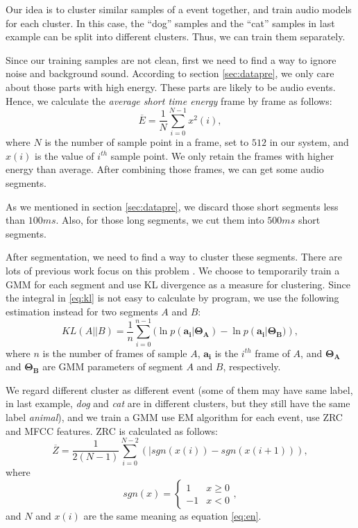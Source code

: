 Our idea is to cluster similar samples of a event together, and train audio models for each cluster. In this case, the ``dog'' samples and the ``cat'' samples in last example can be split into different clusters. Thus, we can train them separately.

Since our training samples are not clean, first we need to find a way to ignore noise and background sound. According to section \ref{sec:datapre}, we only care about those parts with high energy. These parts are likely to be audio events. Hence, we calculate the {\em average short time energy} frame by frame as follows:
\begin{equation}
\overline{E} = \frac{1}{N}\sum_{i=0}^{N-1}x^2(i),
\label{eq:en}
\end{equation}
where $N$ is the number of sample point in a frame, set to $512$ in our system, and $x(i)$ is the value of $i^{th}$ sample point. We only retain the frames with higher energy than average. After combining those frames, we can get some audio segments.

As we mentioned in section \ref{sec:datapre}, we discard those short segments less than $100ms$. Also, for those long segments, we cut them into $500ms$ short segments.

After segmentation, we need to find a way to cluster these segments. There are lots of previous work focus on this problem \cite{4587600}. We choose to temporarily train a GMM for each segment and use KL divergence as a measure for clustering. Since the integral in \ref{eq:kl} is not easy to calculate by program, we use the following estimation instead for two segments $A$ and $B$:
\begin{equation}
KL(A||B) = \frac{1}{n}\sum_{i=0}^{n-1}(\ln p(\mathbf{a_i}|\mathbf{\Theta_A}) - \ln p(\mathbf{a_i}|\mathbf{\Theta_B)}),
\end{equation}
where $n$ is the number of frames of sample $A$, $\mathbf{a_i}$ is the $i^{th}$ frame of $A$, and $\mathbf{\Theta_A}$ and $\mathbf{\Theta_B}$ are GMM parameters of segment $A$ and $B$, respectively.

We regard different cluster as different event (some of them may have same label, in last example, {\em dog} and {\em cat} are in different clusters, but they still have the same label {\em animal}), and we train a GMM use EM algorithm for each event, use ZRC and MFCC features. ZRC is calculated as follows:
\begin{equation}
\overline{Z} = \frac{1}{2(N - 1)}\sum_{i=0}^{N-2}(|sgn(x(i)) - sgn(x(i + 1))),
\end{equation}
where
\begin{equation}
sgn(x) = \left\{\begin{array}{ll} 1 & x\geq 0\\ -1 & x < 0\end{array}\right.,
\end{equation}
and $N$ and $x(i)$ are the same meaning as equation \ref{eq:en}.
